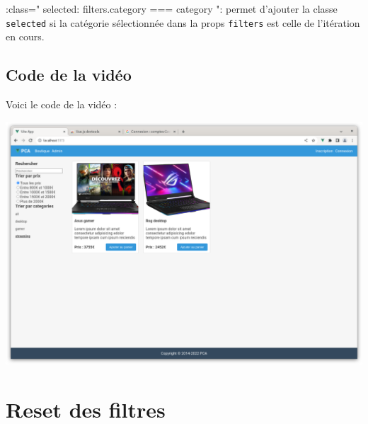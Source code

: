 {\color{monOrange} :class="{ selected: filters.category === category }":} permet d'ajouter la classe {\tt selected} si la catégorie sélectionnée dans la {\color{monOrange} props} {\tt filters} est celle de l'itération en cours.

\subsection{Code de la vidéo}
Voici le code de la vidéo :
\begin{center}
\includegraphics[width=15cm]{images/image27.png}
\end{center}

\section{Reset des filtres}
